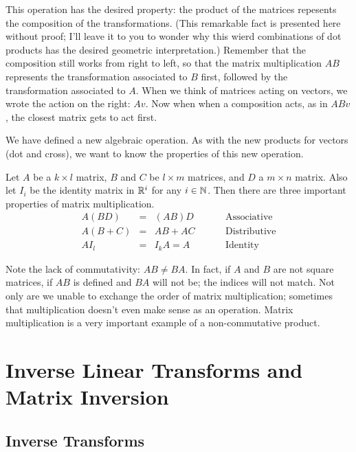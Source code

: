 \documentclass[fleqn]{report}
\begin{document}
This operation has the desired property: the product of the
matrices repesents the composition of the transformations.
(This remarkable fact is presented here without proof; I'll
leave it to you to wonder why this wierd combinations of dot
products has the desired geometric interpretation.)
Remember that the composition still works from right to
left, so that the matrix multiplication $AB$ represents the
transformation associated to $B$ first, followed by the
transformation associated to $A$. When we think of matrices
acting on vectors, we wrote the action on the right: $Av$. Now
when when a composition acts, as in $ABv$, the closest
matrix gets to act first.

We have defined a new algebraic operation. As with the new
products for vectors (dot and cross), we want to know the
properties of this new operation.

\begin{prop}
Let $A$ be a $k \times l$ matrix, $B$ and $C$ be $l \times m$
matrices, and $D$ a $m \times n$ matrix. Also let $I_i$ be
the identity matrix in $\mathbb{R}^i$ for any $i \in \mathbb{N}$. Then 
there are three important properties of matrix multiplication.
\begin{displaymath}
\begin{array}{rcll}
A(BD) & = & (AB) D \hspace{1cm} & \text{Associative} \\
A(B+C) & = & AB + AC \hspace{1cm} & \text{Distributive} \\
AI_l & = & I_kA = A \hspace{1cm} & \text{Identity}
\end{array}
\end{displaymath}
\end{prop}

Note the lack of commutativity: $AB \neq BA$. In fact, if $A$
and $B$ are not square matrices, if $AB$ is defined and $BA$
will not be; the indices will not match. Not only are we
unable to exchange the order of matrix multiplication;
sometimes that multiplication doesn't even make sense as an
operation. Matrix multiplication is a very important example
of a non-commutative product.

\chapter{Inverse Linear Transforms and Matrix Inversion}

\section{Inverse Transforms}
\end{document}
